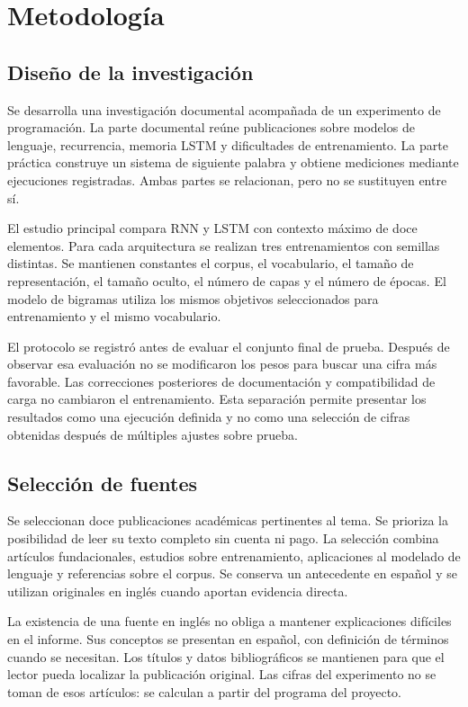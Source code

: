 \section{Metodología}
\subsection{Diseño de la investigación}
Se desarrolla una investigación documental acompañada de un experimento de programación. La parte documental reúne publicaciones sobre modelos de lenguaje, recurrencia, memoria LSTM y dificultades de entrenamiento. La parte práctica construye un sistema de siguiente palabra y obtiene mediciones mediante ejecuciones registradas. Ambas partes se relacionan, pero no se sustituyen entre sí.

El estudio principal compara RNN y LSTM con contexto máximo de doce elementos. Para cada arquitectura se realizan tres entrenamientos con semillas distintas. Se mantienen constantes el corpus, el vocabulario, el tamaño de representación, el tamaño oculto, el número de capas y el número de épocas. El modelo de bigramas utiliza los mismos objetivos seleccionados para entrenamiento y el mismo vocabulario.

El protocolo se registró antes de evaluar el conjunto final de prueba. Después de observar esa evaluación no se modificaron los pesos para buscar una cifra más favorable. Las correcciones posteriores de documentación y compatibilidad de carga no cambiaron el entrenamiento. Esta separación permite presentar los resultados como una ejecución definida y no como una selección de cifras obtenidas después de múltiples ajustes sobre prueba.

\subsection{Selección de fuentes}
Se seleccionan doce publicaciones académicas pertinentes al tema. Se prioriza la posibilidad de leer su texto completo sin cuenta ni pago. La selección combina artículos fundacionales, estudios sobre entrenamiento, aplicaciones al modelado de lenguaje y referencias sobre el corpus. Se conserva un antecedente en español y se utilizan originales en inglés cuando aportan evidencia directa.

La existencia de una fuente en inglés no obliga a mantener explicaciones difíciles en el informe. Sus conceptos se presentan en español, con definición de términos cuando se necesitan. Los títulos y datos bibliográficos se mantienen para que el lector pueda localizar la publicación original. Las cifras del experimento no se toman de esos artículos: se calculan a partir del programa del proyecto.

